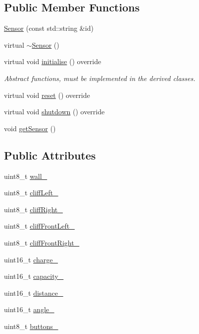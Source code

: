 \subsection*{Public Member Functions}
\begin{DoxyCompactItemize}
\item 
\hyperlink{class_sensor_a8615bafe3f2aa8f8b12b1199eaa577c4}{Sensor} (const std\+::string \&id)
\item 
virtual \hyperlink{class_sensor_aa730e9961dd645e9df9644c52b6e72eb}{$\sim$\+Sensor} ()
\item 
virtual void \hyperlink{class_sensor_aa6175cacabc044409786f6d43a72ae29}{initialise} () override
\begin{DoxyCompactList}\small\item\em Abstract functions, must be implemented in the derived classes. \end{DoxyCompactList}\item 
virtual void \hyperlink{class_sensor_a004fc50012f81dbfdce7a2541fa6130d}{reset} () override
\item 
virtual void \hyperlink{class_sensor_a9b3ea7f61f41b68a4fb9141d887a7271}{shutdown} () override
\item 
void \hyperlink{class_sensor_a6ee10780572766a9488cb34f8d4d0550}{get\+Sensor} ()
\end{DoxyCompactItemize}
\subsection*{Public Attributes}
\begin{DoxyCompactItemize}
\item 
uint8\+\_\+t \hyperlink{class_sensor_a09506b22991de665b8e85727bfced262}{wall\+\_\+}
\item 
uint8\+\_\+t \hyperlink{class_sensor_a89a6486654f1185fd60f328688862d8c}{cliff\+Left\+\_\+}
\item 
uint8\+\_\+t \hyperlink{class_sensor_a8d9d5b9904b3f5efcf9b0bcfc7b9a935}{cliff\+Right\+\_\+}
\item 
uint8\+\_\+t \hyperlink{class_sensor_ab1a85642aa3468803b02d8ebfa6e1c4d}{cliff\+Front\+Left\+\_\+}
\item 
uint8\+\_\+t \hyperlink{class_sensor_a5bff8fe2bb2ee243c3c62646d8111d46}{cliff\+Front\+Right\+\_\+}
\item 
uint16\+\_\+t \hyperlink{class_sensor_a2ab14861ceb9304f9b6dc7a8eab5e156}{charge\+\_\+}
\item 
uint16\+\_\+t \hyperlink{class_sensor_a7facd4c626717aa8dceebcd763df339f}{capacity\+\_\+}
\item 
uint16\+\_\+t \hyperlink{class_sensor_aca4dd39ba9201b4e6d4b8033310bb4d0}{distance\+\_\+}
\item 
uint16\+\_\+t \hyperlink{class_sensor_ab6b2271ec67379c1adb9cc8d81f38db9}{angle\+\_\+}
\item 
uint8\+\_\+t \hyperlink{class_sensor_a4f50f4893bd2600973bb20b2f56fd184}{buttons\+\_\+}
\end{DoxyCompactItemize}
